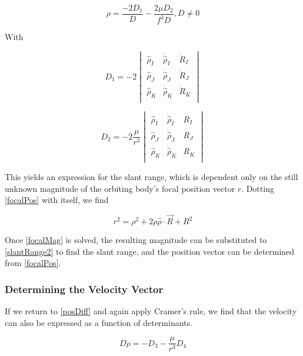 \documentclass[11pt,twoside,letterpaper]{article}
\begin{document}
  \begin{equation} \label{slantRange2}
    \rho = \frac{-2D_1}{D} - \frac{2\mu D_2}{f^3D} , D \neq 0
  \end{equation}

  With

  \begin{equation} \label{D1}
    D_1 = -2\begin{vmatrix}
    \hat{\rho}_I& \dot{\hat{\rho}}_I& \ddot{R}_I \\
    \hat{\rho}_J& \dot{\hat{\rho}}_J& \ddot{R}_J \\
    \hat{\rho}_K& \dot{\hat{\rho}}_K& \ddot{R}_K \\
    \end{vmatrix}
  \end{equation}

  \begin{equation} \label{D2}
    D_2 = -2\frac{\mu}{r^3}\begin{vmatrix}
    \hat{\rho}_I& \dot{\hat{\rho}}_I& R_I \\
    \hat{\rho}_J& \dot{\hat{\rho}}_J& R_J \\
    \hat{\rho}_K& \dot{\hat{\rho}}_K& R_K \\
    \end{vmatrix}
  \end{equation}

  This yields an expression for the slant range, which is dependent
  only on the still unknown magnitude of the orbiting body's focal
  position vector $r$. Dotting \ref{focalPos} with itself, we find

  \begin{equation} \label{focalMag}
    r^2 = \rho^2 + 2\rho \hat{\rho}\cdot\vec{R} + R^2
  \end{equation}

  Once \ref{focalMag} is solved, the resulting magnitude can be
  substituted to \ref{slantRange2} to find the slant range, and the
  position vector can be determined from \ref{focalPos}.

  \subsubsection{Determining the Velocity Vector}
  If we return to \ref{posDiff} and again apply Cramer's rule, we find
  that the velocity can also be expressed as a function of determinants.

  \begin{equation} \label{slantVelocity}
    D\dot{\rho} = -D_3 - \frac{\mu}{r^3}D_4
  \end{equation}
\end{document}
